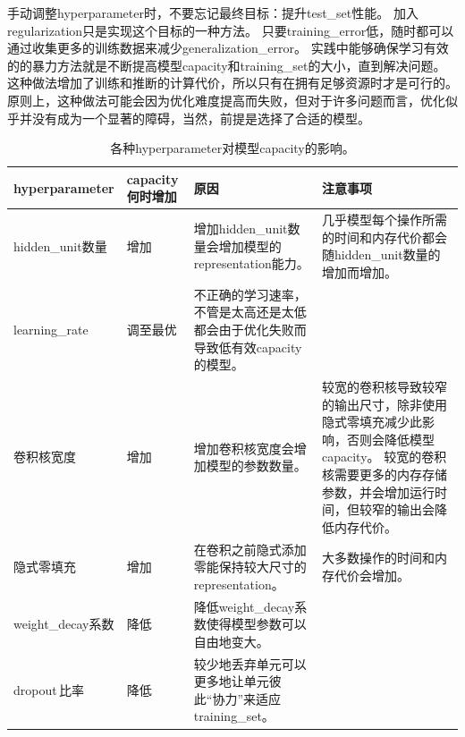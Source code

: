 手动调整\gls{hyperparameter}时，不要忘记最终目标：提升\gls{test_set}性能。
加入\gls{regularization}只是实现这个目标的一种方法。
只要\gls{training_error}低，随时都可以通过收集更多的训练数据来减少\gls{generalization_error}。
实践中能够确保学习有效的的暴力方法就是不断提高模型\gls{capacity}和\gls{training_set}的大小，直到解决问题。
这种做法增加了训练和推断的计算代价，所以只有在拥有足够资源时才是可行的。
原则上，这种做法可能会因为优化难度提高而失败，但对于许多问题而言，优化似乎并没有成为一个显著的障碍，当然，前提是选择了合适的模型。


\begin{table}
\centering
\small
\begin{tabular}{p{2.5cm}|p{1.5cm}|p{4.0cm}|p{4.0cm}}
\gls{hyperparameter} & \gls{capacity}何时增加 & 原因  & 注意事项 \\
\hline
\gls{hidden_unit}数量 &  增加          & 增加\gls{hidden_unit}数量会增加模型的\gls{representation}能力。 & 几乎模型每个操作所需的时间和内存代价都会随\gls{hidden_unit}数量的增加而增加。\\
\hline
\gls{learning_rate} & 调至最优 & 不正确的学习速率，不管是太高还是太低都会由于优化失败而导致低有效\gls{capacity}的模型。
 & \\
\hline
卷积核宽度 & 增加 & 增加卷积核宽度会增加模型的参数数量。&
较宽的卷积核导致较窄的输出尺寸，除非使用隐式零填充减少此影响，否则会降低模型\gls{capacity}。 
较宽的卷积核需要更多的内存存储参数，并会增加运行时间，但较窄的输出会降低内存代价。
\\
\hline
隐式零填充 & 增加 & 在卷积之前隐式添加零能保持较大尺寸的\gls{representation}。&
大多数操作的时间和内存代价会增加。\\
\hline
\gls{weight_decay}系数 & 降低 & 降低\gls{weight_decay}系数使得模型参数可以自由地变大。
 & \\
\hline
\gls{dropout}\,比率 & 降低 & 较少地丢弃单元可以更多地让单元彼此``协力''来适应\gls{training_set}。
 & \\
\end{tabular}
\caption{各种\gls{hyperparameter}对模型\gls{capacity}的影响。}
\label{tab:hyperparameter_effect}
\end{table}




